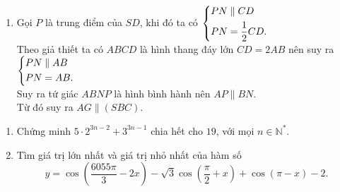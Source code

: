 \begin{bt}
{\begin{enumerate}
			Khi đó $\heva{&F \in SD\\&F \in IN \subset (AMN)}$. Suy ra $F$ chính là giao điểm của $SD$ và $(AMN)$.
			\item Gọi $P$ là trung điểm của $SD$, khi đó ta có $\left\{\begin{aligned}&PN\parallel CD\\&PN=\dfrac{1}{2}CD.\end{aligned}\right.$\\
			Theo giả thiết ta có $ABCD$ là hình thang đáy lớn $CD = 2 AB$ nên suy ra $\left\{\begin{aligned}&PN\parallel AB\\&PN=AB.\end{aligned}\right.$\\
			Suy ra tứ giác $ABNP$ là hình bình hành nên $AP\parallel BN$.\\
			Từ đó suy ra $AG\parallel (SBC)$.
		\end{enumerate}
	}
\end{bt}

\begin{bt}%
	\item
	\begin{enumerate}
	\item Chứng minh $5 \cdot 2^{3n-2}+3^{3n-1}$ chia hết cho $19$, với mọi $n \in \mathbb{N^*}$.
	\item Tìm giá trị lớn nhất và giá trị nhỏ nhất của hàm số $$y=\cos\left( \dfrac{6055\pi}{3}-2x\right)-\sqrt{3}\cos\left( \dfrac{\pi}{2}+x\right)+\cos\left( \pi-x\right)-2.$$
	\end{enumerate}
\end{bt}
